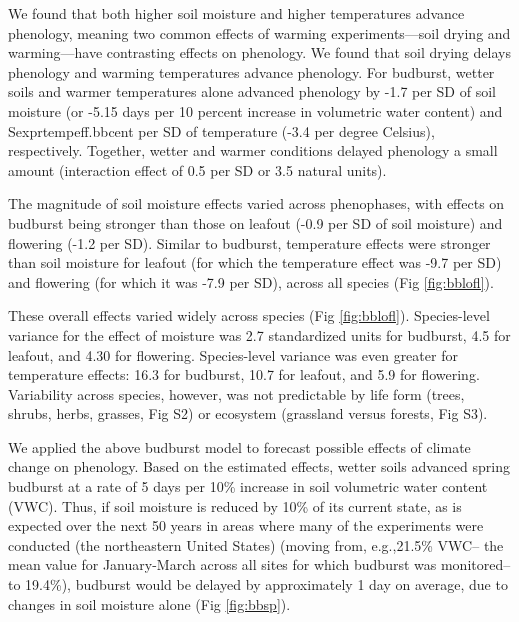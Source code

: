 \documentclass{article}
\begin{document}
\par We found that both higher soil moisture and higher temperatures advance phenology, meaning two common effects of warming experiments---soil drying and warming---have contrasting effects on phenology. We found that soil drying delays phenology and warming temperatures advance phenology. For budburst, wetter soils and warmer temperatures alone advanced phenology by -1.7 per SD of soil moisture  (or -5.15 days per 10 percent increase in volumetric water content) and Sexpr{tempeff.bbcent} per SD of temperature (-3.4 per degree Celsius), respectively. Together, wetter and warmer conditions delayed phenology a small amount (interaction effect of 0.5 per SD or 3.5 natural units). 
\par The magnitude of soil moisture effects varied across phenophases, with effects on budburst being stronger than those on leafout (-0.9 per SD of soil moisture) and flowering (-1.2 per SD). Similar to budburst, temperature effects were stronger than soil moisture for leafout (for which the temperature effect was -9.7 per SD) and flowering (for which it was -7.9 per SD), across all species (Fig \ref{fig:bblofl}). 
\par These overall effects varied widely across species (Fig \ref{fig:bblofl}). Species-level variance for the effect of moisture was 2.7 standardized units for budburst, 4.5 for leafout, and 4.30 for flowering. Species-level variance was even greater for temperature effects: 16.3 for budburst, 10.7 for leafout, and 5.9 for flowering. Variability across species, however, was not predictable by life form (trees, shrubs, herbs, grasses, Fig S2) or ecosystem (grassland versus forests, Fig S3).
\par We applied the above budburst model to forecast possible effects of climate change on phenology. Based on the estimated effects, wetter soils advanced spring budburst at a rate of 5 days per 10\% increase in soil volumetric water content (VWC). Thus, if soil moisture is reduced by 10\% of its current state, as is expected over the next 50 years in areas where many of the experiments were conducted (the northeastern United States) \citep{berg2017} (moving from, e.g.,21.5\% VWC-- the mean value for January-March across all sites for which budburst was monitored-- to 19.4\%), budburst would be delayed by approximately 1 day on average, due to changes in soil moisture alone (Fig \ref{fig:bbsp}).
\end{document}
